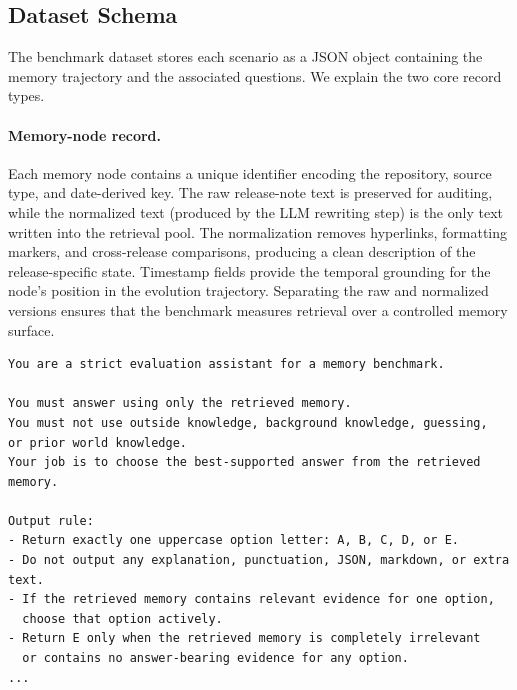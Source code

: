 \subsection{Dataset Schema}

The benchmark dataset stores each scenario as a JSON object containing the memory trajectory and the associated questions. We explain the two core record types.



\paragraph{Memory-node record.}
Each memory node contains a unique identifier encoding the repository, source type, and date-derived key. The raw release-note text is preserved for auditing, while the normalized text (produced by the LLM rewriting step) is the only text written into the retrieval pool. The normalization removes hyperlinks, formatting markers, and cross-release comparisons, producing a clean description of the release-specific state. Timestamp fields provide the temporal grounding for the node's position in the evolution trajectory. Separating the raw and normalized versions ensures that the benchmark measures retrieval over a controlled memory surface.


\begin{lstlisting}[caption={Excerpt from the answer-generation prompt.},label={lst:answer-prompt}]
You are a strict evaluation assistant for a memory benchmark.

You must answer using only the retrieved memory.
You must not use outside knowledge, background knowledge, guessing,
or prior world knowledge.
Your job is to choose the best-supported answer from the retrieved memory.

Output rule:
- Return exactly one uppercase option letter: A, B, C, D, or E.
- Do not output any explanation, punctuation, JSON, markdown, or extra text.
- If the retrieved memory contains relevant evidence for one option,
  choose that option actively.
- Return E only when the retrieved memory is completely irrelevant
  or contains no answer-bearing evidence for any option.
...
\end{lstlisting}

